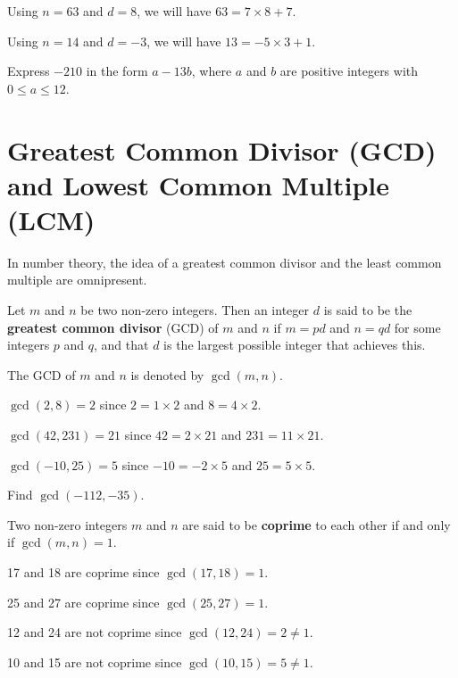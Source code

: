 \begin{example}
    Using $n = 63$ and $d = 8$, we will have $63 = 7\times8 + 7$.
\end{example}
\begin{example}
    Using $n = 14$ and $d = -3$, we will have $13 = -5\times3 + 1$.
\end{example}

\begin{exercise}
    Express $-210$ in the form $a-13b$, where $a$ and $b$ are positive integers with $0 \leq a \leq 12$.
\end{exercise}

\section{Greatest Common Divisor (GCD) and Lowest Common Multiple (LCM)}
In number theory, the idea of a greatest common divisor and the least common multiple are omnipresent.

\begin{definition}
    Let $m$ and $n$ be two non-zero integers. Then an integer $d$ is said to be the \textbf{greatest common divisor} (GCD) of $m$ and $n$ if $m = pd$ and $n = qd$ for some integers $p$ and $q$, and that $d$ is the largest possible integer that achieves this.

    The GCD of $m$ and $n$ is denoted by $\gcd(m, n)$.
\end{definition}

\begin{example}
    $\gcd(2, 8) = 2$ since $2 = 1 \times 2$ and $8 = 4 \times 2$.
\end{example}
\begin{example}
    $\gcd(42, 231) = 21$ since $42 = 2 \times 21$ and $231 = 11 \times 21$.
\end{example}
\begin{example}
    $\gcd(-10, 25) = 5$ since $-10 = -2 \times 5$ and $25 = 5 \times 5$.
\end{example}
\begin{exercise}
    Find $\gcd(-112, -35)$.
\end{exercise}

\begin{definition}
    Two non-zero integers $m$ and $n$ are said to be \textbf{coprime} to each other if and only if $\gcd(m, n) = 1$.
\end{definition}
\begin{example}
    17 and 18 are coprime since $\gcd(17, 18) = 1$.
\end{example}
\begin{example}
    25 and 27 are coprime since $\gcd(25, 27) = 1$.
\end{example}
\begin{example}
    12 and 24 are not coprime since $\gcd(12, 24) = 2 \neq 1$.
\end{example}
\begin{example}
    10 and 15 are not coprime since $\gcd(10, 15) = 5 \neq 1$.
\end{example}

